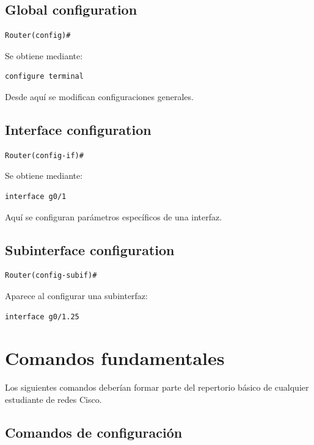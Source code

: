 \documentclass[12pt]{article}
\begin{document}
\subsection{Global configuration}

\begin{lstlisting}
Router(config)#
\end{lstlisting}

Se obtiene mediante:

\begin{lstlisting}
configure terminal
\end{lstlisting}

Desde aquí se modifican configuraciones generales.


\subsection{Interface configuration}

\begin{lstlisting}
Router(config-if)#
\end{lstlisting}

Se obtiene mediante:

\begin{lstlisting}
interface g0/1
\end{lstlisting}

Aquí se configuran parámetros específicos de una interfaz.


\subsection{Subinterface configuration}

\begin{lstlisting}
Router(config-subif)#
\end{lstlisting}

Aparece al configurar una subinterfaz:

\begin{lstlisting}
interface g0/1.25
\end{lstlisting}


\section{Comandos fundamentales}

Los siguientes comandos deberían formar parte del repertorio básico de
cualquier estudiante de redes Cisco.

\subsection{Comandos de configuración}
\end{document}
